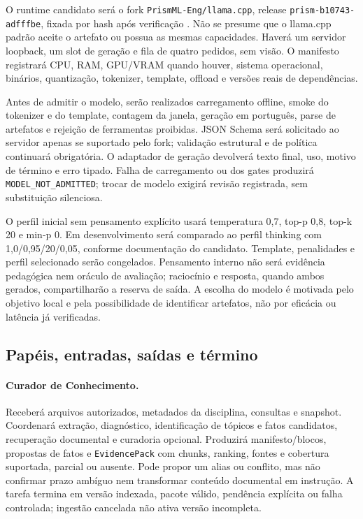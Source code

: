 \documentclass[12pt]{article}
\let\cite\citep
\newcommand{\code}[1]{\nolinkurl{#1}}
\begin{document}
O runtime candidato será o fork \code{PrismML-Eng/llama.cpp}, release \code{prism-b10743-adfffbe}, fixada por hash após verificação \cite{bonsaidemo}. Não se presume que o llama.cpp padrão aceite o artefato ou possua as mesmas capacidades. Haverá um servidor loopback, um slot de geração e fila de quatro pedidos, sem visão. O manifesto registrará CPU, RAM, GPU/VRAM quando houver, sistema operacional, binários, quantização, tokenizer, template, offload e versões reais de dependências.

Antes de admitir o modelo, serão realizados carregamento offline, smoke do tokenizer e do template, contagem da janela, geração em português, parse de artefatos e rejeição de ferramentas proibidas. JSON Schema será solicitado ao servidor apenas se suportado pelo fork; validação estrutural e de política continuará obrigatória. O adaptador de geração devolverá texto final, uso, motivo de término e erro tipado. Falha de carregamento ou dos gates produzirá \code{MODEL_NOT_ADMITTED}; trocar de modelo exigirá revisão registrada, sem substituição silenciosa.

O perfil inicial sem pensamento explícito usará temperatura 0,7, top-p 0,8, top-k 20 e min-p 0. Em desenvolvimento será comparado ao perfil thinking com 1,0/0,95/20/0,05, conforme documentação do candidato. Template, penalidades e perfil selecionado serão congelados. Pensamento interno não será evidência pedagógica nem oráculo de avaliação; raciocínio e resposta, quando ambos gerados, compartilharão a reserva de saída. A escolha do modelo é motivada pelo objetivo local e pela possibilidade de identificar artefatos, não por eficácia ou latência já verificadas.

\subsection{Papéis, entradas, saídas e término}

\paragraph{Curador de Conhecimento.}
Receberá arquivos autorizados, metadados da disciplina, consultas e snapshot. Coordenará extração, diagnóstico, identificação de tópicos e fatos candidatos, recuperação documental e curadoria opcional. Produzirá manifesto/blocos, propostas de fatos e \code{EvidencePack} com chunks, ranking, fontes e cobertura suportada, parcial ou ausente. Pode propor um alias ou conflito, mas não confirmar prazo ambíguo nem transformar conteúdo documental em instrução. A tarefa termina em versão indexada, pacote válido, pendência explícita ou falha controlada; ingestão cancelada não ativa versão incompleta.
\end{document}
